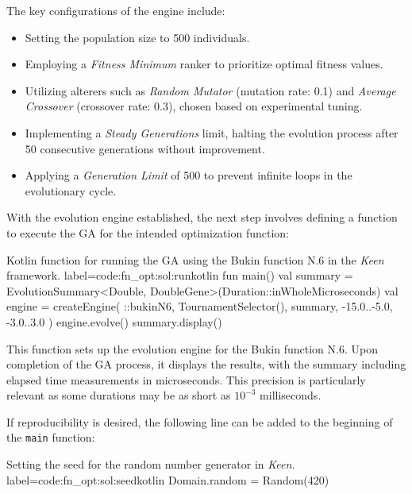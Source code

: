         The key configurations of the engine include:

        \begin{itemize}
        \item Setting the population size to 500 individuals.
        \item Employing a \textit{Fitness Minimum} ranker to prioritize optimal 
            fitness values.
        \item Utilizing alterers such as \textit{Random Mutator} (mutation rate: 
            0.1) and \textit{Average Crossover} (crossover rate: 0.3), chosen based 
            on experimental tuning.
        \item Implementing a \textit{Steady Generations} limit, halting the 
            evolution process after 50 consecutive generations without improvement.
        \item Applying a \textit{Generation Limit} of 500 to prevent infinite 
            loops in the evolutionary cycle.
        \end{itemize}

        With the evolution engine established, the next step involves defining a function to execute the GA for the 
        intended optimization function:

        \begin{code}{
            Kotlin function for running the GA using the Bukin function N.6 in the \textit{Keen} framework.
        }{label=code:fn_opt:sol:run}{kotlin}
            fun main() {
                val summary = EvolutionSummary<Double, DoubleGene>(Duration::inWholeMicroseconds)
                val engine = createEngine(
                    ::bukinN6, 
                    TournamentSelector(), 
                    summary, 
                    -15.0..-5.0, 
                    -3.0..3.0
                )
                engine.evolve()
                summary.display()
            }
        \end{code}

        This function sets up the evolution engine for the Bukin function N.6. Upon completion of the GA process, it 
        displays the results, with the summary including elapsed time measurements in microseconds. This precision is 
        particularly relevant as some durations may be as short as \(10^{-3}\) milliseconds.

        If reproducibility is desired, the following line can be added to the
        beginning of the \texttt{main} function:

        \begin{code}{
            Setting the seed for the random number generator in \textit{Keen}.
        }{label=code:fn_opt:sol:seed}{kotlin}
            Domain.random = Random(420)
        \end{code}

